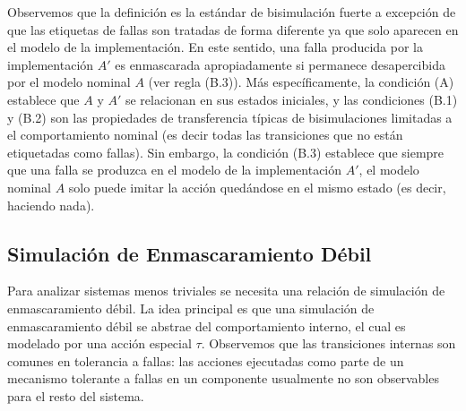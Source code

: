 Observemos que la definición es la estándar de bisimulación fuerte a excepción de que las etiquetas de fallas son tratadas de forma diferente ya que solo aparecen en el modelo de la implementación.  En este sentido, una falla producida por la implementación $A'$ es enmascarada apropiadamente si permanece desapercibida por el modelo nominal $A$ (ver regla (B.3)).
%
Más específicamente, la condición (A) establece que $A$ y $A'$ se relacionan en sus estados iniciales, y las condiciones (B.1) y (B.2) son las propiedades de transferencia típicas de bisimulaciones limitadas a el comportamiento nominal (es decir todas las transiciones que no están etiquetadas como fallas).
%
Sin embargo, la condición (B.3) establece que siempre que una falla se produzca en el modelo de la implementación $A'$, el modelo nominal $A$ solo puede imitar la acción quedándose en el mismo estado (es decir, haciendo nada).

\subsection{Simulación de Enmascaramiento Débil}

Para analizar sistemas menos triviales se necesita una relación de simulación de enmascaramiento débil. La idea principal es que una simulación de enmascaramiento débil se abstrae del comportamiento interno, el cual es modelado por una acción especial $\tau$. Observemos que las transiciones internas son comunes en tolerancia a fallas: las acciones ejecutadas como parte de un mecanismo tolerante a fallas en un componente usualmente no son observables para el resto del sistema.


